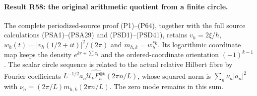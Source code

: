 \paragraph{Result R58: the original arithmetic quotient from a finite circle.}
The complete periodized-source proof (P1)--(P64), together with the
full source calculations (PSA1)--(PSA29) and (PSD1)--(PSD41), retains
$v_h=2\xi/h$, $w_h(t)=|v_h(1/2+it)|^2/(2\pi)$ and
$m_{h,k}=w_h^{*k}$. Its logarithmic coordinate map keeps the density
$e^{kr+\sum z_i}$ and the ordered-coordinate orientation
$(-1)^{k-1}$. The scalar circle sequence is related to the actual
relative Hilbert fibre by Fourier coefficients
$L^{-1/2}a_n\widehat{\mathcal U_kF_h^{\otimes k}}(2\pi n/L)$,
whose squared norm is $\sum_n\nu_n|a_n|^2$ with
$\nu_n=(2\pi/L)m_{h,k}(2\pi n/L)$. The zero mode remains in this sum.

